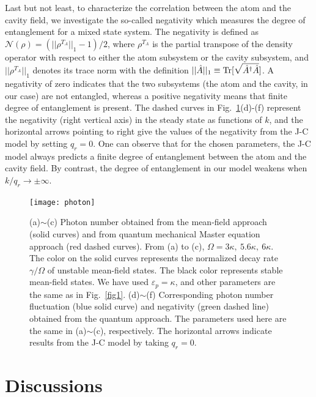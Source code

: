 \documentclass[atoms,article,submit,moreauthors,pdftex,12pt,a4paper]{mdpi}
\begin{document}
Last but not least, to characterize the correlation between the atom and the cavity field, we investigate the so-called negativity \cite{negativity} which measures the degree of entanglement for a mixed state system.
The negativity is defined as $\mathcal{N}(\rho)=(||\rho^{T_A}||_1-1)/2$, where $\rho^{T_A}$ is the partial transpose of the density operator with respect to either the atom subsystem or the cavity subsystem, and $||\rho^{T_A}||_1$ denotes its trace norm with the definition $||\hat{A}||_1 \equiv {\rm Tr}[\sqrt{\hat{A}^\dag \hat{A}} ]$. A negativity of zero indicates that the two subsystems (the atom and the cavity, in our case) are not entangled, whereas a positive negativity means that finite degree of entanglement is present. The dashed curves in Fig.~\ref{photon}(d)-(f) represent the negativity (right vertical axis) in the steady state as functions of $k$, and the horizontal arrows pointing to right give the values of the negativity from the J-C model by setting $q_r=0$. One can observe that for the chosen parameters, the J-C model always predicts a finite degree of entanglement between the atom and the cavity field. By contrast, the degree of entanglement in our model weakens when $k/q_r \rightarrow \pm \infty$.

\begin{figure}[htp]
\texttt{[image: photon]}
\caption{(a)$\sim$(c) Photon number obtained from the mean-field approach (solid curves) and from quantum mechanical Master equation approach (red dashed curves). From (a) to (c), $\Omega = 3\kappa,\ 5.6\kappa,\ 6\kappa$. The color on the solid curves represents the normalized decay rate $\gamma/\Omega$ of unstable mean-field states. The black color represents stable mean-field states. We have used $\varepsilon_p=\kappa$, and other parameters are the same as in Fig.~\ref{fig1}. (d)$\sim$(f) Corresponding photon number fluctuation (blue solid curve) and negativity (green dashed line) obtained from the quantum approach. The parameters used here are the same in (a)$\sim$(c), respectively. The horizontal arrows indicate results from the J-C model by taking $q_r=0$. 
}\label{photon}
\end{figure}

\section{Discussions} \label{relation}
\end{document}
